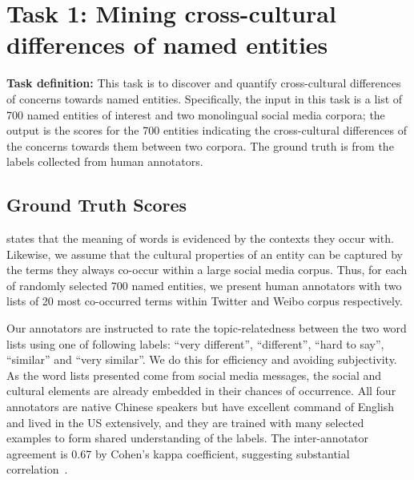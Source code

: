 \section{Task 1: Mining cross-cultural differences of named entities}
\label{sec:mcdne}

\textbf{Task definition:}
	This task is to discover and quantify cross-cultural differences of concerns towards named entities.  
	Specifically, the input in this task is a list of 700 named entities of interest and two monolingual social media corpora; the output is the scores for the 700 entities indicating the cross-cultural differences of the concerns towards them between two corpora. 
	The ground truth is from the labels collected from human annotators.

\subsection{Ground Truth Scores}
\label{sec:mcdne_truth}
\citet{harris1954distributional} states that the meaning of 
words is evidenced by the contexts they occur with. 
Likewise, we assume that the cultural properties of an entity 
can be captured by the terms they always co-occur within a large social media corpus. 
Thus, for each of randomly selected 700 named entities, we present human annotators with two lists of 20 most co-occurred terms within Twitter and Weibo corpus respectively. 

Our annotators are instructed to rate the topic-relatedness between the 
two word lists using one of following labels: ``very different'', 
``different'', ``hard to say'',  ``similar'' and 
``very similar''. We do this for efficiency and avoiding subjectivity. 
As the word lists presented come from social media messages, the social and cultural elements are already embedded in their chances of occurrence.
{All four annotators are native Chinese speakers 
but have excellent command of English and lived in the US extensively, and they are trained with many 
selected examples to form shared understanding of the
labels. The inter-annotator agreement is 0.67 by Cohen's kappa coefficient, suggesting substantial correlation~\cite{Landis1977TheMO}.} 




